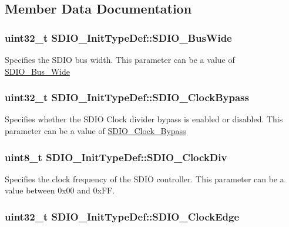 \subsection{Member Data Documentation}
\hypertarget{structSDIO__InitTypeDef_a0540529f615c2b29933b442bc326f0a7}{
\subsubsection[{SDIO\_\-BusWide}]{\setlength{\rightskip}{0pt plus 5cm}uint32\_\-t {\bf SDIO\_\-InitTypeDef::SDIO\_\-BusWide}}}
\label{structSDIO__InitTypeDef_a0540529f615c2b29933b442bc326f0a7}
Specifies the SDIO bus width. This parameter can be a value of \hyperlink{group__SDIO__Bus__Wide}{SDIO\_\-Bus\_\-Wide} \hypertarget{structSDIO__InitTypeDef_a6a06a65a5630b21da261f46125cb20b1}{
\subsubsection[{SDIO\_\-ClockBypass}]{\setlength{\rightskip}{0pt plus 5cm}uint32\_\-t {\bf SDIO\_\-InitTypeDef::SDIO\_\-ClockBypass}}}
\label{structSDIO__InitTypeDef_a6a06a65a5630b21da261f46125cb20b1}
Specifies whether the SDIO Clock divider bypass is enabled or disabled. This parameter can be a value of \hyperlink{group__SDIO__Clock__Bypass}{SDIO\_\-Clock\_\-Bypass} \hypertarget{structSDIO__InitTypeDef_a4166ee534e6cf8ac2c6a6a03bec45b06}{
\subsubsection[{SDIO\_\-ClockDiv}]{\setlength{\rightskip}{0pt plus 5cm}uint8\_\-t {\bf SDIO\_\-InitTypeDef::SDIO\_\-ClockDiv}}}
\label{structSDIO__InitTypeDef_a4166ee534e6cf8ac2c6a6a03bec45b06}
Specifies the clock frequency of the SDIO controller. This parameter can be a value between 0x00 and 0xFF. \hypertarget{structSDIO__InitTypeDef_a3252c846b68988b8ae70ca0d40030a52}{
\subsubsection[{SDIO\_\-ClockEdge}]{\setlength{\rightskip}{0pt plus 5cm}uint32\_\-t {\bf SDIO\_\-InitTypeDef::SDIO\_\-ClockEdge}}}
